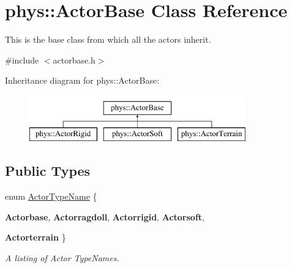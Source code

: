 \hypertarget{classphys_1_1ActorBase}{
\section{phys::ActorBase Class Reference}
\label{d8/d0f/classphys_1_1ActorBase}
}


This is the base class from which all the actors inherit.  




{\ttfamily \#include $<$actorbase.h$>$}

Inheritance diagram for phys::ActorBase:\begin{figure}[H]
\begin{center}
\leavevmode
\includegraphics[height=2.000000cm]{d8/d0f/classphys_1_1ActorBase}
\end{center}
\end{figure}
\subsection*{Public Types}
\begin{DoxyCompactItemize}
\item 
enum \hyperlink{classphys_1_1ActorBase_aff3a7c464e8ce82576073f8f891434b7}{ActorTypeName} \{ \par
{\bfseries Actorbase}, 
{\bfseries Actorragdoll}, 
{\bfseries Actorrigid}, 
{\bfseries Actorsoft}, 
\par
{\bfseries Actorterrain}
 \}
\begin{DoxyCompactList}\small\item\em A listing of Actor TypeNames. \item\end{DoxyCompactList}\end{DoxyCompactItemize}
